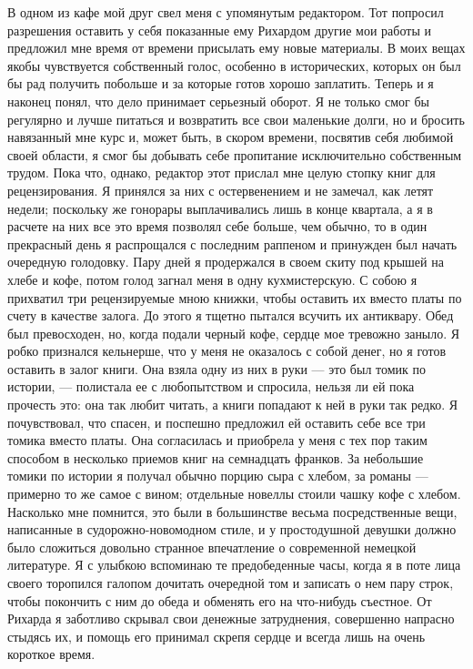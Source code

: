 В  одном из  кафе  мой друг  свел меня  с  упомянутым редактором.  Тот
попросил  разрешения оставить  у себя  показанные ему  Рихардом другие
мои  работы и  предложил  мне  время от  времени  присылать ему  новые
материалы. В моих вещах  якобы чувствуется собственный голос, особенно
в исторических, которых  он был бы рад получить побольше  и за которые
готов хорошо заплатить.  Теперь и я наконец понял,  что дело принимает
серьезный оборот.  Я не только  смог бы  регулярно и лучше  питаться и
возвратить все свои маленькие долги,  но и бросить навязанный мне курс
и, может быть, в скором  времени, посвятив себя любимой своей области,
я смог  бы добывать себе пропитание  исключительно собственным трудом.
Пока  что, однако,  редактор этот  прислал мне  целую стопку  книг для
рецензирования. Я  принялся за них  с остервенением и не  замечал, как
летят  недели;  поскольку  же  гонорары  выплачивались  лишь  в  конце
квартала, а я в расчете на них все это время позволял себе больше, чем
обычно, то в один прекрасный день я распрощался с последним раппеном и
принужден был  начать очередную голодовку.  Пару дней я  продержался в
своем скиту под крышей на хлебе и кофе, потом голод загнал меня в одну
кухмистерскую.  С собою  я  прихватил три  рецензируемые мною  книжки,
чтобы оставить их вместо платы по  счету в качестве залога. До этого я
тщетно пытался всучить  их антиквару. Обед был  превосходен, но, когда
подали  черный кофе,  сердце мое  тревожно заныло.  Я робко  признался
кельнерше, что у меня не оказалось  с собой денег, но я готов оставить
в залог  книги. Она  взяла одну  из них в  руки ---  это был  томик по
истории, --- полистала ее с любопытством и спросила, нельзя ли ей пока
прочесть это: она так любит читать, а  книги попадают к ней в руки так
редко. Я  почувствовал, что спасен,  и поспешно предложил  ей оставить
себе все три томика вместо платы. Она согласилась и приобрела у меня с
тех пор таким способом в несколько приемов книг на семнадцать франков.
За небольшие томики по истории я  получал обычно порцию сыра с хлебом,
за романы ---  примерно то же самое с вином;  отдельные новеллы стоили
чашку кофе  с хлебом. Насколько  мне помнится, это были  в большинстве
весьма посредственные  вещи, написанные в  судорожно-новомодном стиле,
и  у  простодушной девушки  должно  было  сложиться довольно  странное
впечатление о  современной немецкой литературе. Я  с улыбкою вспоминаю
те предобеденные  часы, когда я  в поте лица своего  торопился галопом
дочитать очередной том и записать о  нем пару строк, чтобы покончить с
ним  до обеда  и обменять  его на  что-нибудь съестное.  От Рихарда  я
заботливо  скрывал  свои  денежные  затруднения,  совершенно  напрасно
стыдясь их, и помощь его принимал скрепя сердце и всегда лишь на очень
короткое время.

